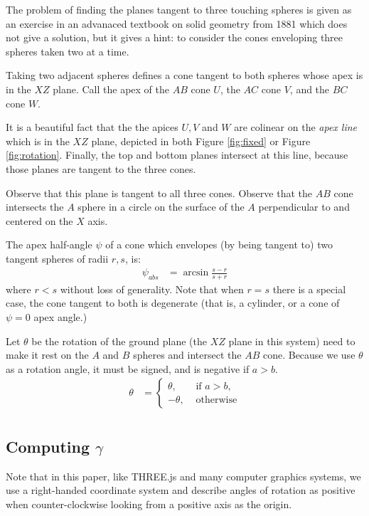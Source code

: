 \documentclass{article}
\begin{document}
The problem of finding the planes tangent to three touching spheres
is given as an exercise in an advanaced textbook on solid geometry from 1881\cite{payne1881} which does not give a solution,
but it gives a hint: to consider the cones enveloping
three spheres taken two at a time.

Taking two adjacent spheres defines a cone tangent to both spheres whose apex is in the $XZ$ plane.
Call the apex of the $AB$ cone $U$, the $AC$ cone $V$, and the $BC$ cone $W$.

It is a beautiful fact that the the apices $U,V$ and $W$ are colinear
on the {\em apex line} which is in the $XZ$ plane, depicted in both Figure \ref{fig:fixed}
or Figure \ref{fig:rotation}.
Finally, the top and bottom planes
intersect at this line, because those planes are tangent to the three cones.

Observe that this plane is tangent to all three cones.
Observe that the $AB$ cone intersects
the $A$ sphere in a circle on the surface of the $A$ perpendicular to and centered on the $X$ axis.

The apex half-angle $\psi$ of a cone which envelopes (by being tangent to) two tangent
spheres of radii $r,s$, is:
\begin{align}
 \psi_{abs} &= \arcsin{\frac{s - r}{s + r}}
\end{align}
where $r < s$ without loss of generality. Note that when $r = s$
there is a special case,
the cone tangent to both is degenerate (that is, a cylinder, or a cone of
$\psi = 0$ apex angle.)

Let $\theta$ be the rotation of the ground plane (the $XZ$ plane in this system) need to make
it rest on the $A$ and $B$ spheres and intersect the $AB$ cone.
Because we use $\theta$ as a rotation angle, it must be signed, and is
negative if $a > b$.
\begin{align}
  \theta &= \begin{cases}
    \theta, & \text{ if $a > b$, } \\
    -\theta, & \text{  otherwise}
\end{cases} \label{eq:theta} \\
\end{align}

\subsection{Computing $\gamma$}

Note that in this paper, like THREE.js and many computer graphics systems,
we use a right-handed coordinate system and describe angles of rotation as
positive when counter-clockwise looking from a positive axis as the origin.
\end{document}
